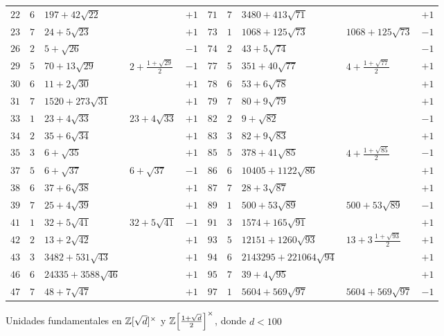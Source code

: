 \begin{figure}
\begin{center}
\begin{tabular}{M{0.3cm}M{0.4cm}M{2.5cm}M{2.1cm}M{0.7cm}|M{0.3cm}M{0.4cm}M{3.3cm}M{2.4cm}M{0.7cm}}
      $22$ & $6$ & $197 + 42\sqrt{22}$ & & $+1$ & $71$ & $7$ & $3480 + 413\sqrt{71}$ & & $+1$ \\
      $23$ & $7$ & $24 + 5\sqrt{23}$ & & $+1$ & $73$ & $1$ & $1068 + 125\sqrt{73}$ & $1068 + 125\sqrt{73}$ & $-1$ \\
      $26$ & $2$ & $5 + \sqrt{26}$ & & $-1$ & $74$ & $2$ & $43 + 5\sqrt{74}$ & & $-1$ \\
      $29$ & $5$ & $70 + 13\sqrt{29}$ & $2 + \frac{1+\sqrt{29}}{2}$ & $-1$ & $77$ & $5$ & $351 + 40\sqrt{77}$ & $4 + \frac{1+\sqrt{77}}{2}$ & $+1$ \\
      $30$ & $6$ & $11 + 2\sqrt{30}$ & & $+1$ & $78$ & $6$ & $53 + 6\sqrt{78}$ & & $+1$ \\
      $31$ & $7$ & $1520 + 273\sqrt{31}$ & & $+1$ & $79$ & $7$ & $80 + 9\sqrt{79}$ & & $+1$ \\
      $33$ & $1$ & $23 + 4\sqrt{33}$ & $23 + 4\sqrt{33}$ & $+1$ & $82$ & $2$ & $9 + \sqrt{82}$ & & $-1$ \\
      $34$ & $2$ & $35 + 6\sqrt{34}$ & & $+1$ & $83$ & $3$ & $82 + 9\sqrt{83}$ & & $+1$ \\
      $35$ & $3$ & $6 + \sqrt{35}$ & & $+1$ & $85$ & $5$ & $378 + 41\sqrt{85}$ & $4 + \frac{1+\sqrt{85}}{2}$ & $-1$ \\
      $37$ & $5$ & $6 + \sqrt{37}$ & $6 + \sqrt{37}$ & $-1$ & $86$ & $6$ & $10405 + 1122\sqrt{86}$ & & $+1$ \\
      $38$ & $6$ & $37 + 6\sqrt{38}$ & & $+1$ & $87$ & $7$ & $28 + 3\sqrt{87}$ & & $+1$ \\
      $39$ & $7$ & $25 + 4\sqrt{39}$ & & $+1$ & $89$ & $1$ & $500 + 53\sqrt{89}$ & $500 + 53\sqrt{89}$ & $-1$ \\
      $41$ & $1$ & $32 + 5\sqrt{41}$ & $32 + 5\sqrt{41}$ & $-1$ & $91$ & $3$ & $1574 + 165\sqrt{91}$ & & $+1$ \\
      $42$ & $2$ & $13 + 2\sqrt{42}$ & & $+1$ & $93$ & $5$ & $12151 + 1260\sqrt{93}$ & $13 + 3\,\frac{1+\sqrt{93}}{2}$ & $+1$ \\
      $43$ & $3$ & $3482 + 531\sqrt{43}$ & & $+1$ & $94$ & $6$ & $2143295 + 221064\sqrt{94}$ & & $+1$ \\
      $46$ & $6$ & $24335 + 3588\sqrt{46}$ & & $+1$ & $95$ & $7$ & $39 + 4\sqrt{95}$ & & $+1$ \\
      $47$ & $7$ & $48 + 7\sqrt{47}$ & & $+1$ & $97$ & $1$ & $5604 + 569\sqrt{97}$ & $5604 + 569\sqrt{97}$ & $-1$ \\
    \end{tabular}
  \end{center}

  \caption{Unidades fundamentales en $\mathbb{Z} [\sqrt{d}]^\times$ y $\mathbb{Z} \Bigl[\frac{1+\sqrt{d}}{2}\Bigr]^\times$, donde $d < 100$}
  \label{fig:unidades-fundamentales-cuadraticas}
\end{figure}

